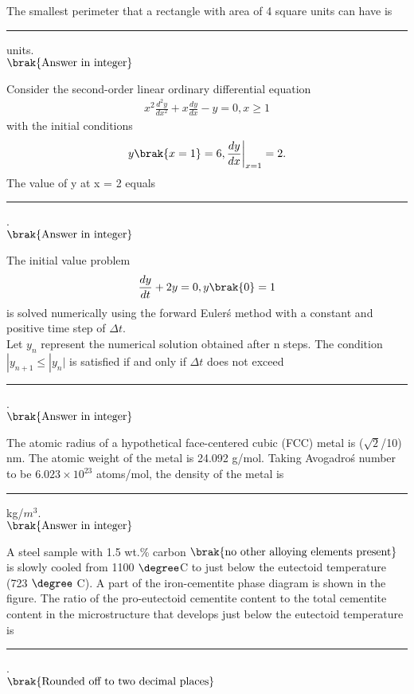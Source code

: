 \item The smallest perimeter that a rectangle with area of 4 square units can have is \rule{1cm}{0.4pt} units. \\
	$\brak{\text{Answer in integer}}$
\item Consider the second-order linear ordinary differential equation
	\begin{align*}
		x^2\frac{d^2y}{dx^2} + x\frac{dy}{dx} - y = 0, x \geq 1
	\end{align*}
	with the initial conditions
	\begin{align*}
		y\brak{x = 1} = 6, \frac{dy}{dx}\bigg|_{x=1} = 2.
	\end{align*}
	The value of y at x = 2 equals \rule{1cm}{0.4pt}. \\
	$\brak{\text{Answer in integer}}$
\item The initial value problem
	\begin{align*}
		\frac{dy}{dt} + 2y = 0, y\brak{0} = 1
	\end{align*}
	is solved numerically using the forward Euler\'s method with a constant and positive time step of $\Delta t$. \\
	Let $y_n$ represent the numerical solution obtained after n steps. The condition $|y_{n+1} \leq |y_n|$ is satisfied if and only if $\Delta t$ does not exceed \rule{1cm}{0.4pt}. \\
	$\brak{\text{Answer in integer}}$
\item The atomic radius of a hypothetical face-centered cubic (FCC) metal is ($\sqrt{2}$/10) nm. The atomic weight of the metal is 24.092 g/mol. Taking Avogadro\'s number to be $6.023 \times 10^{23}$ atoms/mol, the density of the metal is \rule{1cm}{0.4pt} kg/$m^3$. \\
	$\brak{\text{Answer in integer}}$
\item A steel sample with 1.5 wt.\% carbon $\brak{\text{no other alloying elements present}}$ is slowly cooled from 1100 $\degree$C to just below the eutectoid temperature (723 $\degree$ C). A part of the iron-cementite phase diagram is shown in the figure. The ratio of the pro-eutectoid cementite content to the total cementite content in the microstructure that develops just below the eutectoid temperature is \rule{1cm}{0.4pt}. \\
	$\brak{\text{Rounded off to two decimal places}}$
